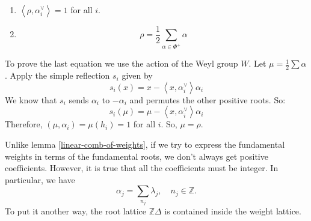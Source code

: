 \documentclass[12pt]{article} %
\begin{document}
\begin{enumerate}
    \item $\left\langle\rho,\alpha_i^\vee\right\rangle = 1$ for all $i$.
    \item
          \[
              \rho = \frac{1}{2} \sum_{\alpha \in \Phi^+} \alpha
          \]
\end{enumerate}

To prove the last equation we use the action of the Weyl group $W$. Let $\mu = \frac{1}{2} \sum \alpha$. Apply the simple reflection $s_i$ given by
\[
    s_i(x) = x - \left\langle x, \alpha_i^\vee\right\rangle \alpha_i
\]
We know that $s_i$ sends $\alpha_i$ to $-\alpha_i$ and permutes the other positive roots. So:
\[
    s_i(\mu) = \mu -  \left\langle x, \alpha_i^\vee\right\rangle  \alpha_i
\]
Therefore, $(\mu, \alpha_i) = \mu(h_i) = 1$ for all $i$. So, $\mu = \rho$.

Unlike lemma \ref{linear-comb-of-weights}, if we try to express the fundamental weights in terms of the fundamental roots, we don't always
get positive coefficients. However, it is true that all the coefficients must be integer. In particular, we have
\[\alpha_j = \sum_{n_j}\lambda_j, \quad n_j \in \mathbb{Z}.\]
To put it another way, the root lattice $\mathbb{Z}\Delta$ is contained inside the weight lattice.
\end{document}
